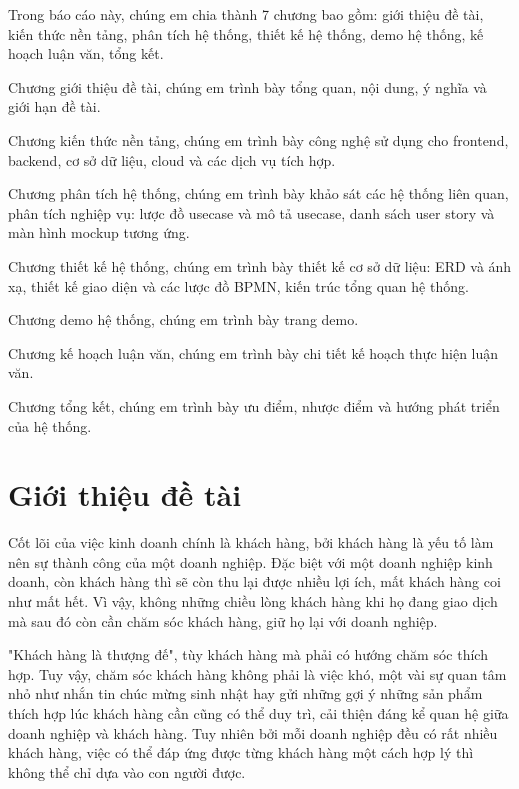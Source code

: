 \documentclass[12pt,a4paper]{article}
\begin{document}
    Trong báo cáo này, chúng em chia thành 7 chương bao gồm: giới thiệu đề tài, kiến thức nền tảng, phân tích hệ thống, thiết kế hệ thống, demo hệ thống, kế hoạch luận văn, tổng kết.

    Chương giới thiệu đề tài, chúng em trình bày tổng quan, nội dung, ý nghĩa và giới hạn đề tài.

    Chương kiến thức nền tảng, chúng em trình bày công nghệ sử dụng cho frontend, backend, cơ sở dữ liệu, cloud và các dịch vụ tích hợp.

    Chương phân tích hệ thống, chúng em trình bày khảo sát các hệ thống liên quan, phân tích nghiệp vụ: lược đồ usecase và mô tả usecase, danh sách user story và màn hình mockup tương ứng.

    Chương thiết kế hệ thống, chúng em trình bày thiết kế cơ sở dữ liệu: ERD và ánh xạ, thiết kế giao diện và các lược đồ BPMN, kiến trúc tổng quan hệ thống.

    Chương demo hệ thống, chúng em trình bày trang demo.

    Chương kế hoạch luận văn, chúng em trình bày chi tiết kế hoạch thực hiện luận văn.

    Chương tổng kết, chúng em trình bày ưu điểm, nhược điểm và hướng phát triển của hệ thống.

    \newpage
    \tableofcontents

    \newpage
    \listoffigures

    \newpage
    \listoftables

    \newpage


    \section{Giới thiệu đề tài}
    Cốt lõi của việc kinh doanh chính là khách hàng, bởi khách hàng là yếu tố làm nên sự thành công của một doanh nghiệp. Đặc biệt với một doanh nghiệp kinh doanh, còn khách hàng thì sẽ còn thu lại được nhiều lợi ích, mất khách hàng coi như mất hết. Vì vậy, không những chiều lòng khách hàng khi họ đang giao dịch mà sau đó còn cần chăm sóc khách hàng, giữ họ lại với doanh nghiệp.

    "Khách hàng là thượng đế", tùy khách hàng mà phải có hướng chăm sóc thích hợp. Tuy vậy, chăm sóc khách hàng không phải là việc khó, một vài sự quan tâm nhỏ như nhắn tin chúc mừng sinh nhật hay gửi những gợi ý những sản phẩm thích hợp lúc khách hàng cần cũng có thể duy trì, cải thiện đáng kể quan hệ giữa doanh nghiệp và khách hàng. Tuy nhiên bởi mỗi doanh nghiệp đều có rất nhiều khách hàng, việc có thể đáp ứng được từng khách hàng một cách hợp lý thì không thể chỉ dựa vào con người được.
\end{document}
